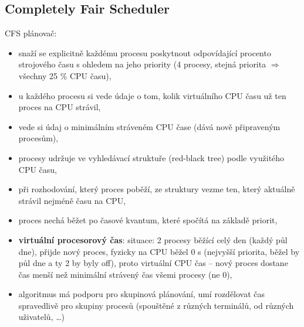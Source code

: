 \documentclass[a4paper, 11pt]{article}
\begin{document}
\subsection{Completely Fair Scheduler}
CFS plánovač:
\begin{itemize}
    \item snaží se explicitně každému procesu poskytnout odpovídající procento strojového času s ohledem na jeho priority (4 procesy, stejná priorita $\Rightarrow$ všechny 25 \% CPU času),
    \item u každého procesu si vede údaje o tom, kolik virtuálního CPU času už ten proces na CPU strávil,
    \item vede si údaj o minimálním stráveném CPU čase (dává nově připraveným procesům),
    \item procesy udržuje ve vyhledávací struktuře (red-black tree) podle využitého CPU času,
    \item při rozhodování, který proces poběží, ze struktury vezme ten, který aktuálně strávil nejméně času na CPU,
    \item proces nechá běžet po časové kvantum, které spočítá na základě priorit,
    \item \textbf{virtuální procesorový čas}: situace: 2 procesy běžící celý den (každý půl dne), přijde nový proces, fyzicky na CPU běžel 0 s (nejvyšší priorita, běžel by půl dne a ty 2 by byly off), proto virtuální CPU čas -- nový proces dostane čas menší než minimální strávený čas všemi procesy (ne 0),
    \item algoritmus má podporu pro skupinová plánování, umí rozdělovat čas spravedlivě pro skupiny procesů (spouštěné z různých terminálů, od různých uživatelů, \ldots)
\end{itemize}
\end{document}
